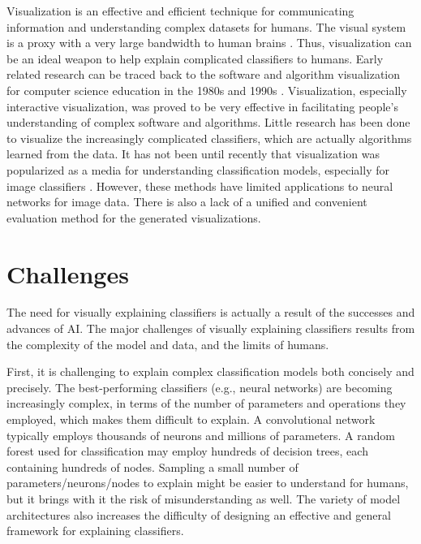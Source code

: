 Visualization is an effective and efficient technique for communicating information and understanding complex datasets for humans. The visual system is a proxy with a very large bandwidth to human brains \cite{munzner2014visualization}. Thus, visualization can be an ideal weapon to help explain complicated classifiers to humans. Early related research can be traced back to the software and algorithm visualization for computer science education in the 1980s and 1990s \cite{brown1987aa,stasko1990aa,price1992taxonomy}. Visualization, especially interactive visualization, was proved to be very effective in facilitating people's understanding of complex software and algorithms.
Little research has been done to visualize the increasingly complicated classifiers, which are actually algorithms learned from the data. It has not been until recently that visualization was popularized as a media for understanding classification models, especially for image classifiers \cite{simonyan14saliency,zeiler2014eccv,bach15plos,zintgraf17visualize}. However, these methods have limited applications to neural networks for image data. There is also a lack of a unified and convenient evaluation method for the generated visualizations. 

\section{Challenges}

The need for visually explaining classifiers is actually a result of the successes and advances of AI. The major challenges of visually explaining classifiers results from the complexity of the model and data, and the limits of humans.

First, it is challenging to explain complex classification models both concisely and precisely. The best-performing classifiers (e.g., neural networks) are becoming increasingly complex, in terms of the number of parameters and operations they employed, which makes them difficult to explain. A convolutional network typically employs thousands of neurons and millions of parameters. A random forest used for classification may employ hundreds of decision trees, each containing hundreds of nodes. Sampling a small number of parameters/neurons/nodes to explain might be easier to understand for humans, but it brings with it the risk of misunderstanding as well. The variety of model architectures also increases the difficulty of designing an effective and general framework for explaining classifiers.

